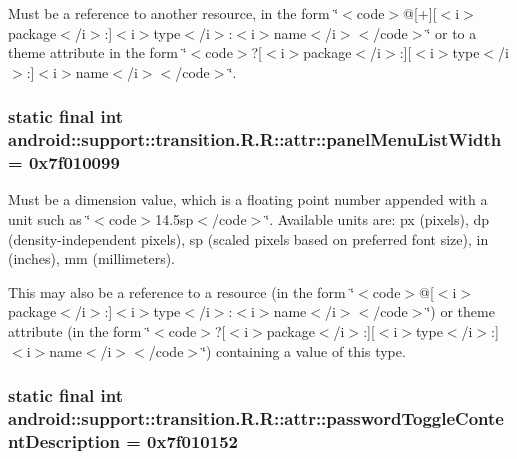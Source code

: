 Must be a reference to another resource, in the form \char`\"{}$<$code$>$@\mbox{[}+\mbox{]}\mbox{[}$<$i$>$package$<$/i$>$:\mbox{]}$<$i$>$type$<$/i$>$:$<$i$>$name$<$/i$>$$<$/code$>$\char`\"{} or to a theme attribute in the form \char`\"{}$<$code$>$?\mbox{[}$<$i$>$package$<$/i$>$:\mbox{]}\mbox{[}$<$i$>$type$<$/i$>$:\mbox{]}$<$i$>$name$<$/i$>$$<$/code$>$\char`\"{}. \hypertarget{classandroid_1_1support_1_1transition_1_1_r_1_1attr_9e19c598edfe5da7692c43d1a653e3e0}{
\subsubsection[{panelMenuListWidth}]{\setlength{\rightskip}{0pt plus 5cm}static final int android::support::transition.R.R::attr::panelMenuListWidth = 0x7f010099}}
\label{classandroid_1_1support_1_1transition_1_1_r_1_1attr_9e19c598edfe5da7692c43d1a653e3e0}


Must be a dimension value, which is a floating point number appended with a unit such as \char`\"{}$<$code$>$14.5sp$<$/code$>$\char`\"{}. Available units are: px (pixels), dp (density-independent pixels), sp (scaled pixels based on preferred font size), in (inches), mm (millimeters). 

This may also be a reference to a resource (in the form \char`\"{}$<$code$>$@\mbox{[}$<$i$>$package$<$/i$>$:\mbox{]}$<$i$>$type$<$/i$>$:$<$i$>$name$<$/i$>$$<$/code$>$\char`\"{}) or theme attribute (in the form \char`\"{}$<$code$>$?\mbox{[}$<$i$>$package$<$/i$>$:\mbox{]}\mbox{[}$<$i$>$type$<$/i$>$:\mbox{]}$<$i$>$name$<$/i$>$$<$/code$>$\char`\"{}) containing a value of this type. \hypertarget{classandroid_1_1support_1_1transition_1_1_r_1_1attr_d6fd0ecd2ca5119b97c37258886c38b7}{
\subsubsection[{passwordToggleContentDescription}]{\setlength{\rightskip}{0pt plus 5cm}static final int android::support::transition.R.R::attr::passwordToggleContentDescription = 0x7f010152}}
\label{classandroid_1_1support_1_1transition_1_1_r_1_1attr_d6fd0ecd2ca5119b97c37258886c38b7}



